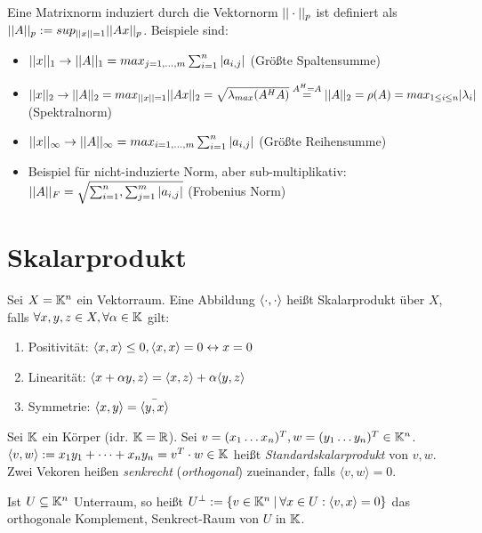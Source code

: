 \begin{definition}
	Eine Matrixnorm induziert durch die Vektornorm $||\cdot||_p$ ist definiert als $||A||_p := sup_{||x|| = 1}||Ax||_p$. Beispiele sind:
	\begin{itemize}[noitemsep]
		\item $||x||_1 \rightarrow ||A||_1 = max_{j=1,...,m} \sum_{i = 1}^n |a_{i,j}|$ (Größte Spaltensumme)
		\item $||x||_2 \rightarrow ||A||_2 = max_{||x||=1} ||Ax||_2 = \sqrt{\lambda_{max}(A^HA)} \overset{A^H = A}{=} ||A||_2 = \rho(A) = max_{1 \leq i \leq n}|\lambda_i|$ (Spektralnorm)	
		\item $||x||_\infty \rightarrow ||A||_\infty = max_{i=1,...,m} \sum_{i = 1}^n |a_{i,j}|$ (Größte Reihensumme)
		\item Beispiel für nicht-induzierte Norm, aber sub-multiplikativ: \\ $||A||_F = \sqrt{\sum_{i = 1}^n, \sum_{j = 1}^m |a_{i,j}|}$ (Frobenius Norm)
	\end{itemize}
\end{definition}

\pagebreak

\section{Skalarprodukt}

\begin{definition}[Skalarprodukt]
	Sei $X = \mathbb{K}^n$ ein Vektorraum. Eine Abbildung $\langle \cdot, \cdot \rangle$ heißt Skalarprodukt über $X$, falls $\forall x,y,z \in X, \forall \alpha \in \mathbb{K}$ gilt:
	
	\begin{enumerate}[noitemsep]
		\item Positivität: $\langle x, x \rangle \leq 0, \langle x, x \rangle = 0 \leftrightarrow x = 0$
		\item Linearität: $\langle x + \alpha y, z \rangle = \langle x, z \rangle + \alpha \langle y, z \rangle$
		\item  Symmetrie: $\langle x, y \rangle = \bar{\langle y, x \rangle}$
	\end{enumerate}
\end{definition}


\begin{definition}[Standardskalarprodukt]
	Sei $\mathbb{K}$ ein Körper (idr. $\mathbb{K} = \mathbb{R}$). Sei $v = (x_1 \dots x_n)^T, w = (y_1 \dots y_n)^T \in \mathbb{K}^n$. $\langle v, w \rangle := x_1y_1 + \dots + x_ny_n = v^T \cdot w \in \mathbb{K}$ heißt \emph{Standardskalarprodukt} von $v,w$.	Zwei Vekoren heißen \emph{senkrecht} (\emph{orthogonal}) zueinander, falls $\langle v, w \rangle = 0$. 
	
	Ist $U \subseteq \mathbb{K}^n$ Unterraum, so heißt $U^{\perp} := \{ v \in \mathbb{K}^n \medspace | \medspace \forall x \in U : \langle v, x \rangle = 0 \}$ das orthogonale Komplement, Senkrect-Raum von $U$ in $\mathbb{K}$.
\end{definition}


